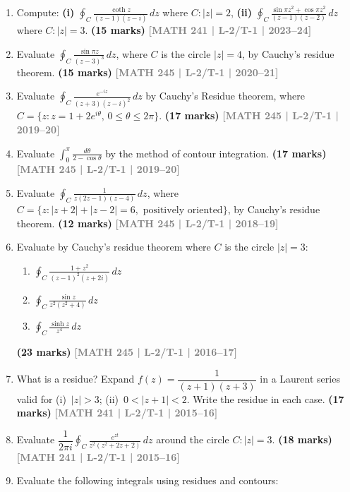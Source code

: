 \documentclass[12pt,a4paper]{article}
\newcommand{\yr}[1]{\hfill\textcolor{gray}{\small\textbf{[#1]}}}
\newcommand{\mk}[1]{\textcolor{orange!70!black}{\small\textbf{(#1 marks)}}}
\begin{document}
\begin{enumerate}\item Compute: \textbf{(i)} $\displaystyle\oint_{C}\frac{\coth z}{(z-1)(z-i)}\,dz$ where $C:|z|=2$, \quad \textbf{(ii)} $\displaystyle\oint_{C}\frac{\sin\pi z^{2}+\cos\pi z^{2}}{(z-1)(z-2)}\,dz$ where $C:|z|=3$.
\mk{15} \yr{MATH 241 | L-2/T-1 | 2023--24}

\item Evaluate $\displaystyle\oint_{C} \frac{\sin\pi z}{(z-3)^{3}}\,dz$, where $C$ is the circle $|z|=4$, by Cauchy's residue theorem.
\mk{15} \yr{MATH 245 | L-2/T-1 | 2020--21}

\item Evaluate $\displaystyle\oint_{C}\frac{e^{-iz}}{(z+3)(z-i)^{2}}\,dz$ by Cauchy's Residue theorem, where $C=\{z:z=1+2e^{i\theta},\,0\le\theta\le 2\pi\}$.
\mk{17} \yr{MATH 245 | L-2/T-1 | 2019--20}

\item Evaluate $\displaystyle\int_{0}^{\pi}\frac{d\theta}{2-\cos\theta}$ by the method of contour integration.
\mk{17} \yr{MATH 245 | L-2/T-1 | 2019--20}

\item Evaluate $\displaystyle\oint_{C}\frac{1}{z(2z-1)(z-4)}\,dz$, where $C=\{z:|z+2|+|z-2|=6,\text{ positively oriented}\}$, by Cauchy's residue theorem.
\mk{12} \yr{MATH 245 | L-2/T-1 | 2018--19}

\item Evaluate by Cauchy's residue theorem where $C$ is the circle $|z|=3$:
\begin{enumerate}
  \item $\displaystyle\oint_{C}\frac{1+z^{2}}{(z-1)^{2}(z+2i)}\,dz$
  \item $\displaystyle\oint_{C}\frac{\sin z}{z^{2}(z^{2}+4)}\,dz$
  \item $\displaystyle\oint_{C}\frac{\sinh z}{z^{4}}\,dz$
\end{enumerate}
\mk{23} \yr{MATH 245 | L-2/T-1 | 2016--17}

\item What is a residue? Expand $f(z)=\dfrac{1}{(z+1)(z+3)}$ in a Laurent series valid for (i)~$|z|>3$; (ii)~$0<|z+1|<2$. Write the residue in each case.
\mk{17} \yr{MATH 241 | L-2/T-1 | 2015--16}

\item Evaluate $\dfrac{1}{2\pi i}\displaystyle\oint_{C}\frac{e^{zt}}{z^{2}(z^{2}+2z+2)}\,dz$ around the circle $C:|z|=3$.
\mk{18} \yr{MATH 241 | L-2/T-1 | 2015--16}

\item Evaluate the following integrals using residues and contours:


\end{enumerate}
\end{document}
